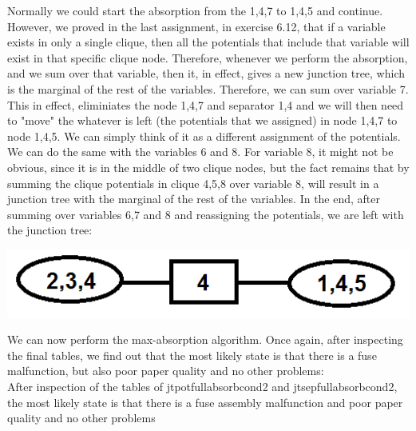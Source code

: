 \documentclass[11pt,a4paper,oneside]{report}
\begin{document}
Normally we could start the absorption from the 1,4,7 to 1,4,5 and continue. However, we proved in the last assignment, in exercise 6.12, that if a variable exists in only a single clique, then all the potentials that include that variable will exist in that specific clique node. Therefore, whenever we perform the absorption, and we sum over that variable, then it, in effect, gives a new junction tree, which is the marginal of the rest of the variables. Therefore, we can sum over variable 7. This in effect, eliminiates the node 1,4,7 and separator 1,4 and we will then need to "move" the whatever is left (the potentials that we assigned) in node 1,4,7 to node 1,4,5. We can simply think of it as a different assignment of the potentials. We can do the same with the variables 6 and 8. For variable 8, it might not be obvious, since it is in the middle of two clique nodes, but the fact remains that by summing the clique potentials in clique 4,5,8 over variable 8, will result in a junction tree with the marginal of the rest of the variables. In the end, after summing over variables 6,7 and 8 and reassigning the potentials, we are left with the junction tree:\\

	\begin{center} \includegraphics[width=1\textwidth]{c9e1junctiontreefinal}\end{center}
	
	We can now perform the max-absorption algorithm. Once again, after inspecting the final tables, we find out that the most likely state is that there is a fuse malfunction, but also poor paper quality and no other problems:\\

After inspection of the tables of jtpotfullabsorbcond2 and jtsepfullabsorbcond2, the most likely state is that there is a fuse assembly malfunction and poor paper quality and no other problems\\\\
\end{document}
